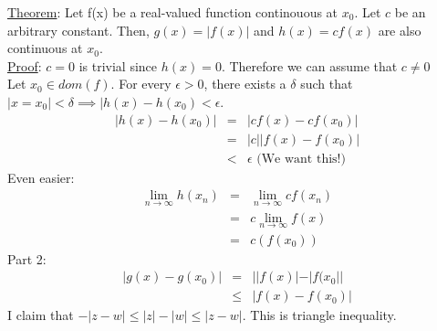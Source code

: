 \documentclass[11pt]{article}
\begin{document}
		\underline{Theorem}: Let f(x) be a real-valued function continouous at $x_0$. Let $c$ be an arbitrary constant. Then, $g(x) = |f(x)|$ and $h(x)= cf(x)$ are also continuous at $x_0$.\\
		\underline{Proof}: $c = 0$ is trivial since $h(x) = 0$.
		Therefore we can assume that $c \not= 0$\\
		Let $x_0 \in dom(f)$. For every $\epsilon > 0$, there exists a $\delta$
		such that $|x = x_0| < \delta \implies |h(x) - h(x_0) < \epsilon$.
		\begin{eqnarray*}
			|h(x) - h(x_0)| &= & |cf(x) - cf(x_0)| \\
			& = & |c| |f(x) - f(x_0)| \\
			& < & \epsilon \text{ (We want this!)} 
		\end{eqnarray*}
		Even easier:
		\begin{eqnarray*}
			\lim_{n \to \infty}{h(x_n)} & = & \lim_{n \to \infty}{c f(x_n)} \\
			& = & c\lim_{n \to \infty}{f(x)}\\
			& = & c(f(x_0))
		\end{eqnarray*}
		Part 2:
		\begin{eqnarray*}
			|g(x) - g(x_0)| &=& ||f(x)| - |f(x_0||\\
			& \le & |f(x) - f(x_0)| 
		\end{eqnarray*}
		I claim that $-|z - w| \le |z| - |w| \le |z - w|$. This is triangle
		inequality. 
\end{document}
